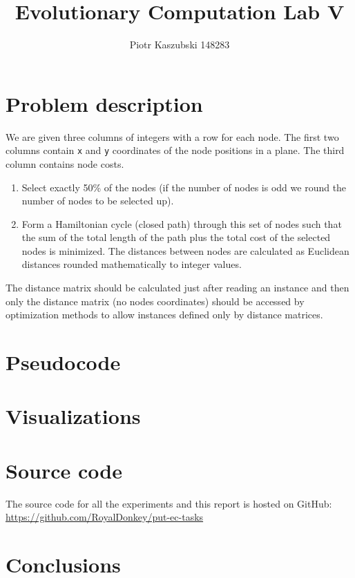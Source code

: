 \documentclass[14pt]{article}
\title{Evolutionary Computation Lab V}
\author{Piotr Kaszubski 148283}
\date{}
\begin{document}
\maketitle
\tableofcontents
\newpage

\section{Problem description}
We are given three columns of integers with a row for each node. The first two
columns contain \verb`x` and \verb`y` coordinates of the node positions in a
plane. The third column contains node costs.

\begin{enumerate}
	\item Select exactly 50\% of the nodes (if the number of nodes is odd we
		round the number of nodes to be selected up).
	\item Form a Hamiltonian cycle (closed path) through this set of nodes such
		that the sum of the total length of the path plus the total cost of the
		selected nodes is minimized. The distances between nodes are calculated
		as Euclidean distances rounded mathematically to integer values.
\end{enumerate}

The distance matrix should be calculated just after reading an instance and
then only the distance matrix (no nodes coordinates) should be accessed by
optimization methods to allow instances defined only by distance matrices.

\section{Pseudocode}

\section{Visualizations}

\newcommand{\visualization}[3]{%
\begin{figure}[H]%
	\begin{adjustwidth}{0}{0}%
		\texttt{[image: results/best\_\#2\_\#1.pdf]}%
	\end{adjustwidth}%
	\vspace{-12mm}%
	\caption{Best #2 solution to #1 (#3)}%
\end{figure}%
}


\section{Source code}
The source code for all the experiments and this report is hosted on GitHub: \\
\url{https://github.com/RoyalDonkey/put-ec-tasks}

\section{Conclusions}
\end{document}
